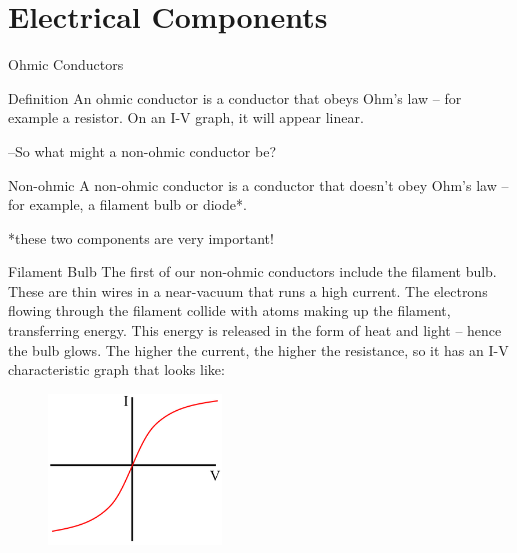 \documentclass[../Main.tex]{subfiles}
\begin{document}
\author{Electrical Components} %
\date{Year 1 Topic 11} %

\section{Electrical Components} %

\begin{frame}{Ohmic Conductors}
    \begin{block}{Definition}
    An ohmic conductor is a conductor that obeys Ohm's law -- for example a resistor. On an I-V graph, it will appear linear.
    \end{block}
    \pause
    --So what might a non-ohmic conductor be? 
    \pause
    \begin{block}{Non-ohmic}
    A non-ohmic conductor is a conductor that doesn't obey Ohm's law -- for example, a filament bulb or diode*. 
    \end{block}
    *these two components are very important! 
\end{frame}

\begin{frame}{Filament Bulb}
    The first of our non-ohmic conductors include the filament bulb. These are thin wires in a near-vacuum that runs a high current. The electrons flowing through the filament collide with atoms making up the filament, transferring energy. This energy is released in the form of heat and light -- hence the bulb glows.
    \pause
   \newline \newline
  The higher the current, the higher the resistance, so it has an I-V characteristic graph that looks like:
    
    \begin{figure}
        \centering
        \includegraphics[height=4cm]{Electricity_Images/IV_filament_bulb.png}
    \end{figure}
\end{frame}
\end{document}
